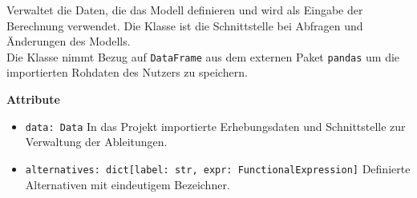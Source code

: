 \documentclass{article}
\begin{document}
Verwaltet die Daten, die das Modell definieren und wird als Eingabe der Berechnung verwendet. Die Klasse ist die Schnittstelle bei Abfragen und Änderungen des Modells.\\
Die Klasse nimmt Bezug auf \texttt{DataFrame} aus dem externen Paket \texttt{pandas} um die importierten Rohdaten des Nutzers zu speichern.
\newline \newline

\textbf{{Attribute}}
\begin{itemize}
\item \texttt{data: Data} \newline In das Projekt importierte Erhebungsdaten und Schnittstelle zur Verwaltung der Ableitungen.
\item \texttt{alternatives: dict[label: str, expr: FunctionalExpression]} \newline
Definierte Alternativen mit eindeutigem Bezeichner.
\\\\
\end{itemize}
\end{document}
